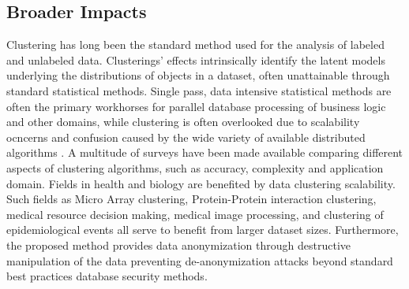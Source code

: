\documentclass[11pt]{article}
\begin{document}
\subsection*{Broader Impacts}

Clustering has long been the standard method used for the analysis of labeled and
unlabeled data.  Clusterings' effects intrinsically identify the latent models underlying
the distributions of objects
in a dataset, often unattainable through standard statistical methods.  Single pass, data
intensive statistical methods are often the primary workhorses for parallel database
processing of business logic and other domains, while clustering is often overlooked due
to scalability ocncerns and confusion caused by the wide variety of available distributed
algorithms \cite{clusters}.  A multitude of surveys \cite{clusters} have been made available
comparing different aspects of clustering algorithms, such as accuracy, complexity and
application domain.  Fields in health and biology are benefited by data clustering
scalability.  Such fields as Micro Array clustering, Protein-Protein interaction
clustering, medical resource decision making, medical image processing, and clustering of
epidemiological events all serve to benefit from larger dataset sizes. Furthermore, the proposed
method provides data anonymization through destructive manipulation of the data preventing
de-anonymization attacks beyond standard best practices database security methods.
\end{document}
